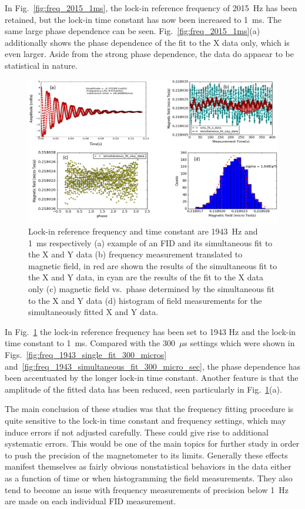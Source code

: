 In Fig.~\ref{fig:freq_2015_1ms}, the lock-in reference frequency of
2015~Hz has been retained, but the lock-in time constant has now been
increased to 1~ms.  The same large phase dependence can be seen.
Fig.~\ref{fig:freq_2015_1ms}(a) additionally shows the phase
dependence of the fit to the X data only, which is even larger.  Aside
from the strong phase dependence, the data do appaear to be
statistical in nature.

\begin{figure}%
\centering\includegraphics[width=0.8\linewidth]{figures/freq_1943_simultaneous_fit_1ms.png}
\caption{Lock-in reference frequency and time constant are 1943~Hz and
  1~ms respectively (a) example of an FID and its simultaneous fit to
  the X and Y data (b) frequency measurement translated to magnetic
  field, in red are shown the results of the simultaneous fit to the X
  and Y data, in cyan are the results of the fit to the X data only
  (c) magnetic field vs.~phase determined by the simultaneous fit to
  the X and Y data (d) histogram of field measurements for the
  simultaneously fitted X and Y
  data.\label{fig:freq_1943_simultaneous_fit_1ms}}
\end{figure}

In Fig.~\ref{fig:freq_1943_simultaneous_fit_1ms} the lock-in reference
frequency has been set to 1943 Hz and the lock-in time constant to
1~ms.  Compared with the 300~$\mu$s settings which were shown in
Figs.~\ref{fig:freq_1943_single_fit_300_micros}
and~\ref{fig:freq_1943_simultaneous_fit_300_micro_sec}, the phase
dependence has been accentuated by the longer lock-in time constant.
Another feature is that the amplitude of the fitted data has been
reduced, seen particularly in
Fig.~\ref{fig:freq_1943_simultaneous_fit_1ms}(a).

The main conclusion of these studies was that the frequency fitting
procedure is quite sensitive to the lock-in time constant and
frequency settings, which may induce errors if not adjusted carefully.
These could give rise to additional systematic errors.  This would be
one of the main topics for further study in order to push the
precision of the magnetometer to its limits.  Generally these effects
manifest themselves as fairly obvious nonstatistical behaviors in the
data either as a function of time or when histogramming the field
measurements.  They also tend to become an issue with frequency
measurements of precision below 1~Hz are made on each individual FID
measurement.


